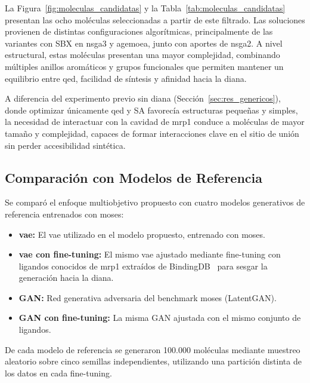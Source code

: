 

La Figura~\ref{fig:moleculas_candidatas} y la Tabla~\ref{tab:moleculas_candidatas} presentan las ocho moléculas seleccionadas a partir de este filtrado. Las soluciones provienen de distintas configuraciones algorítmicas, principalmente de las variantes con SBX en \acrshort{nsga3} y \acrshort{agemoea}, junto con aportes de \acrshort{nsga2}. A nivel estructural, estas moléculas presentan una mayor complejidad, combinando múltiples anillos aromáticos y grupos funcionales que permiten mantener un equilibrio entre \gls{qed}, facilidad de síntesis y afinidad hacia la diana.

A diferencia del experimento previo sin diana (Sección~\ref{sec:res_genericos}), donde optimizar únicamente \gls{qed} y SA favorecía estructuras pequeñas y simples, la necesidad de interactuar con la cavidad de \gls{mrp1} conduce a moléculas de mayor tamaño y complejidad, capaces de formar interacciones clave en el sitio de unión sin perder accesibilidad sintética.

\subsection{Comparación con Modelos de Referencia}
\label{subsec:comp_estado_arte_mrp1}
\label{sec:comparacion_referencia}

Se comparó el enfoque multiobjetivo propuesto con cuatro modelos generativos de referencia entrenados con \gls{moses}:

\begin{itemize}
    \item \textbf{\gls{vae}:} El \gls{vae} utilizado en el modelo propuesto, entrenado con \gls{moses}.
    \item \textbf{\gls{vae} con fine-tuning:} El mismo \gls{vae} ajustado mediante fine-tuning con ligandos conocidos de \gls{mrp1} extraídos de BindingDB~\cite{liu2007bindingdb} para sesgar la generación hacia la diana.
    \item \textbf{GAN:} Red generativa adversaria del benchmark \gls{moses} (LatentGAN).
    \item \textbf{GAN con fine-tuning:} La misma GAN ajustada con el mismo conjunto de ligandos.
\end{itemize}

De cada modelo de referencia se generaron 100.000 moléculas mediante muestreo aleatorio sobre cinco semillas independientes, utilizando una partición distinta de los datos en cada fine-tuning.


